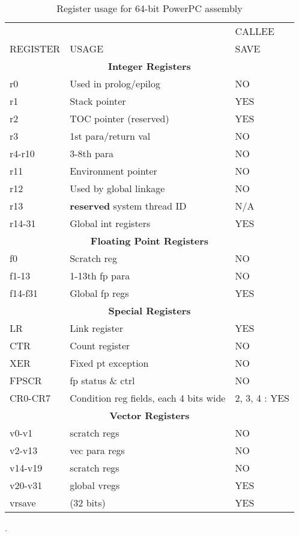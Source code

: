 \documentclass[11pt]{article}
\begin{document}
\begin{table}[hbt] 
\begin{center}
\begin{tabular}{||l|l|l||}\hline\hline
         &       & CALLEE\\
REGISTER & USAGE & SAVE\\\hline\hline
\multicolumn{3}{||c||}{\bf Integer Registers}\\\hline\hline
r0\footnotemark[1]
         & Used in prolog/epilog & NO \\\hline
r1       & Stack pointer         & YES \\\hline
r2       & TOC pointer (reserved)& YES \\\hline
r3       & 1st para/return val   & NO  \\\hline
r4-r10   & 3-8th  para           & NO  \\\hline
r11      & Environment pointer   & NO  \\\hline
r12      & Used by global linkage& NO  \\\hline
r13      & {\bf reserved} system thread ID& N/A \\\hline
r14-31   & Global int registers  & YES  \\\hline\hline
\multicolumn{3}{||c||}{\bf Floating Point Registers}\\\hline\hline
f0       & Scratch reg           & NO \\\hline
f1-13    & 1-13th fp para        & NO \\\hline
f14-f31  & Global fp regs        & YES \\\hline\hline
\multicolumn{3}{||c||}{\bf Special Registers}\\\hline\hline
LR       & Link register         & YES \\\hline
CTR      & Count register        & NO  \\\hline
XER      & Fixed pt exception    & NO  \\\hline
FPSCR    & fp status \& ctrl     & NO  \\\hline\hline
CR0-CR7  & Condition reg fields, each 4 bits wide & 2, 3, 4 : YES\\\hline
\multicolumn{3}{||c||}{\bf Vector Registers}\\\hline\hline
v0-v1    & scratch regs          & NO  \\\hline
v2-v13   & vec para regs         & NO  \\\hline
v14-v19  & scratch regs          & NO  \\\hline
v20-v31  & global vregs          & YES \\\hline
vrsave   & (32 bits)             & YES \\\hline\hline
\end{tabular}
\caption{Register usage for 64-bit PowerPC assembly}
\label{tab-PPC64-regs}.
\end{center}
\end{table}
\end{document}

